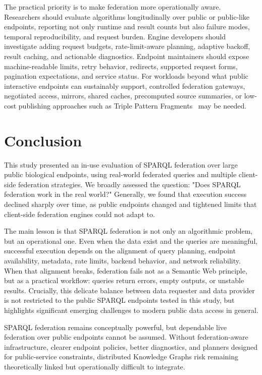 \documentclass[runningheads]{llncs}
\begin{document}
The practical priority is to make federation more operationally aware. 
Researchers should evaluate algorithms longitudinally over public or public-like endpoints, reporting not only runtime and result counts but also failure modes, temporal reproducibility, and request burden. 
Engine developers should investigate adding request budgets, rate-limit-aware planning, adaptive backoff, result caching, and actionable diagnostics. 
Endpoint maintainers should expose machine-readable limits, retry behavior, redirects, supported request forms, pagination expectations, and service status. 
For workloads beyond what public interactive endpoints can sustainably support, controlled federation gateways, negotiated access, mirrors, shared caches, precomputed source summaries, or low-cost publishing approaches such as Triple Pattern Fragments~\cite{Verborgh2016TPF} may be needed.


\section{Conclusion}\label{sec9}
This study presented an in-use evaluation of SPARQL federation over large public biological endpoints, using real-world federated queries and multiple client-side federation strategies. 
We broadly assessed the question: "Does SPARQL federation work in the real world?"
Generally, we found that execution success declined sharply over time, as public endpoints changed and tightened limits that client-side federation engines could not adapt to.

The main lesson is that SPARQL federation is not only an algorithmic problem, but an operational one. 
Even when the data exist and the queries are meaningful, successful execution depends on the alignment of query planning, endpoint availability, metadata, rate limits, backend behavior, and network reliability. 
When that alignment breaks, federation fails not as a Semantic Web principle, but as a practical workflow: queries return errors, empty outputs, or unstable results.
Crucially, this delicate balance between data requester and data provider is not restricted to the public SPARQL endpoints tested in this study, but highlights significant emerging challenges to modern public data access in general.

SPARQL federation remains conceptually powerful, but dependable live federation over public endpoints cannot be assumed. 
Without federation-aware infrastructure, clearer endpoint policies, better diagnostics, and planners designed for public-service constraints, distributed Knowledge Graphs risk remaining theoretically linked but operationally difficult to integrate.
\end{document}
